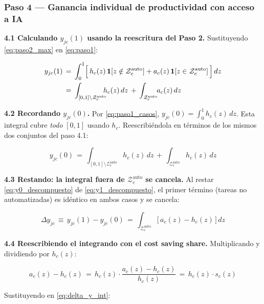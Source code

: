 \documentclass[11pt,a4paper]{article}
\theoremstyle{definition}
\begin{document}
\subsubsection*{Paso 4 --- Ganancia individual de productividad con acceso a IA}

\textbf{4.1 Calculando $y_{jc}(1)$ usando la reescritura del Paso 2.} Sustituyendo \eqref{eq:paso2_max} en \eqref{eq:paso1}:

\begin{align}
y_{jc}(1) &\,=\, \int_0^1\Bigl[\,h_c(z)\,\mathbf{1}[z \notin \mathcal{Z}_c^{\text{auto}}] + a_c(z)\,\mathbf{1}[z \in \mathcal{Z}_c^{\text{auto}}]\,\Bigr]\,dz \notag \\
&\,=\, \int_{[0,1]\setminus\mathcal{Z}_c^{\text{auto}}}\!\!\!\! h_c(z)\,dz \,+\, \int_{\mathcal{Z}_c^{\text{auto}}}\!\! a_c(z)\,dz
\label{eq:y1_descompuesto}
\end{align}

\textbf{4.2 Recordando $y_{jc}(0)$.} Por \eqref{eq:paso1_casos}, $y_{jc}(0) = \int_0^1 h_c(z)\,dz$. Esta integral cubre \textit{todo} $[0,1]$ usando $h_c$. Reescribiéndola en términos de los mismos dos conjuntos del paso 4.1:

\begin{equation}
y_{jc}(0) \,=\, \int_{[0,1]\setminus\mathcal{Z}_c^{\text{auto}}}\!\!\!\! h_c(z)\,dz \,+\, \int_{\mathcal{Z}_c^{\text{auto}}}\!\! h_c(z)\,dz
\label{eq:y0_descompuesto}
\end{equation}

\textbf{4.3 Restando: la integral fuera de $\mathcal{Z}_c^{\text{auto}}$ se cancela.} Al restar \eqref{eq:y0_descompuesto} de \eqref{eq:y1_descompuesto}, el primer término (tareas no automatizadas) es idéntico en ambos casos y se cancela:

\begin{equation}
\Delta y_{jc} \,\equiv\, y_{jc}(1) - y_{jc}(0) \,=\, \int_{\mathcal{Z}_c^{\text{auto}}}\!\!\bigl[\,a_c(z) - h_c(z)\,\bigr]\, dz
\label{eq:delta_y_int}
\end{equation}

\textbf{4.4 Reescribiendo el integrando con el cost saving share.} Multiplicando y dividiendo por $h_c(z)$:

\begin{equation}
a_c(z) - h_c(z) \,=\, h_c(z)\cdot\frac{a_c(z) - h_c(z)}{h_c(z)} \,=\, h_c(z)\cdot s_c(z)
\end{equation}

Sustituyendo en \eqref{eq:delta_y_int}:
\end{document}
